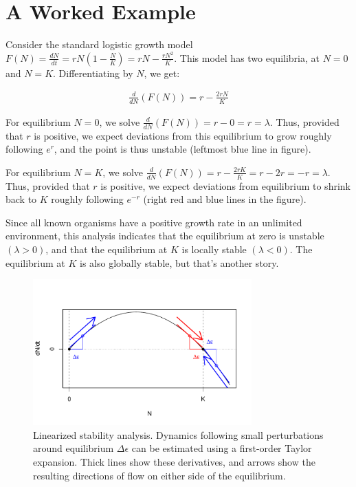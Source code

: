 \documentclass[12pt]{article}
\begin{document}
\section{A Worked Example}

Consider the standard logistic growth model $F(N)=\frac{dN}{dt}=rN(1-\frac{N}{K})=rN-\frac{rN^{2}}{K}$. This model has two equilibria, at $N=0$ and $N=K$. Differentiating by $N$, we get:

\begin{equation}
\begin{split}
\frac{d}{dN}(F(N)) = r - \frac{2rN}{K}
\end{split}
\end{equation}

For equilibrium $N=0$, we solve $\frac{d}{dN}(F(N)) = r - 0 = r = \lambda$. Thus, provided that $r$ is positive, we expect deviations from this equilibrium to grow roughly following $e^{r}$, and the point is thus unstable (leftmost blue line in figure).

For equilibrium $N=K$, we solve $\frac{d}{dN}(F(N)) = r - \frac{2rK}{K} = r - 2r = -r = \lambda$. Thus, provided that $r$ is positive, we expect deviations from equilibrium to shrink back to $K$ roughly following $e^{-r}$ (right red and blue lines in the figure).
 
Since all known organisms have a positive growth rate in an unlimited environment, this analysis indicates that the equilibrium at zero is unstable $(\lambda>0)$, and that the equilibrium at $K$ is locally stable $(\lambda<0)$. The equilibrium at $K$ is also globally stable, but that's another story.

\begin{figure}[H]
  \centering
  \includegraphics[width=0.75\textwidth, page=1]{figures/Eigen_Linear}
  \caption{Linearized stability analysis. Dynamics following small perturbations around equilibrium $\Delta \epsilon$ can be estimated using a first-order Taylor expansion. Thick lines show these derivatives, and arrows show the resulting directions of flow on either side of the equilibrium.}
\end{figure}
\end{document}
